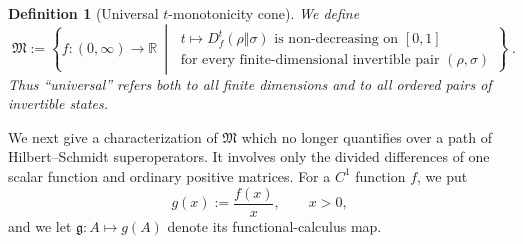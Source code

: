 \documentclass[11pt]{article}
\newtheorem{definition}{Definition}[section]
\theoremstyle{remark}
\newcommand{\1}{\mathbbm{1}}
\begin{document}
\begin{definition}[Universal $t$-monotonicity cone]
\label{rw:def:universal-t-monotonicity-cone}
We define
\begin{equation}
 \boxed{\;
 \mathfrak M
 :=\left\{f:(0,\infty)\to\mathbb R\ \middle|\
 \begin{array}{l}
 t\longmapsto D_f^t(\rho\Vert\sigma)\text{ is non-decreasing on }[0,1]\\
 \text{for every finite-dimensional invertible pair }(\rho,\sigma)
 \end{array}
 \right\}
 \;}.
 \label{rw:eq:universal-t-monotonicity-cone}
\end{equation}
Thus ``universal'' refers both to all finite dimensions and to all
ordered pairs of invertible states.
\end{definition}

We next give a characterization of \(\mathfrak M\) which no longer
quantifies over a path of Hilbert--Schmidt superoperators.  It involves
only the divided differences of one scalar function and ordinary
positive matrices.  For a \(C^1\) function \(f\), we put
\begin{equation}
 g(x):=\frac{f(x)}{x},\qquad x>0,
 \label{rw:eq:universal-cone-g-transform}
\end{equation}
and we let \(\mathfrak g:A\mapsto g(A)\) denote its functional-calculus
map.
\end{document}
